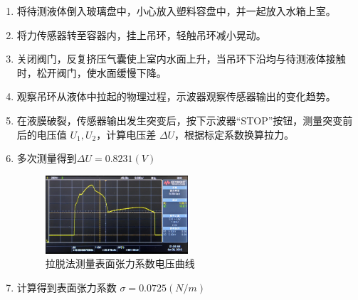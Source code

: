 \documentclass[UTF8]{ctexart}
\begin{document}
\begin{enumerate}
    \item 将待测液体倒入玻璃盘中，小心放入塑料容盘中，并一起放入水箱上室。
    \item 将力传感器转至容器内，挂上吊环，轻触吊环减小晃动。
    \item 关闭阀门，反复挤压气囊使上室内水面上升，当吊环下沿均与待测液体接触时，松开阀门，使水面缓慢下降。
    \item 观察吊环从液体中拉起的物理过程，示波器观察传感器输出的变化趋势。
    \item 在液膜破裂，传感器输出发生突变后，按下示波器“STOP”按钮，测量突变前后的电压值 \(U_1, U_2\)，计算电压差 \(\Delta U\)，根据标定系数换算拉力。
    \item 多次测量得到$\Delta U = 0.8231(V)$
    \begin{figure}[htbp]
        \centering
        \includegraphics[width=0.5\textwidth]{fig.jpg}
        \caption{拉脱法测量表面张力系数电压曲线}
    \end{figure}
    \item 计算得到表面张力系数 $\sigma = 0.0725(N/m)$
\end{enumerate}
\end{document}
